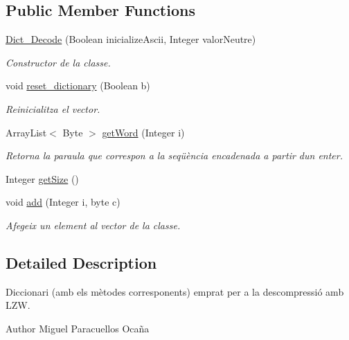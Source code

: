 \subsection*{Public Member Functions}
\begin{DoxyCompactItemize}
\item 
\hyperlink{classdomini_1_1utils_1_1Dict__Decode_a8a0f9e67c530bafc031e72c218ce74f8}{Dict\+\_\+\+Decode} (Boolean inicialize\+Ascii, Integer valor\+Neutre)
\begin{DoxyCompactList}\small\item\em Constructor de la classe. \end{DoxyCompactList}\item 
void \hyperlink{classdomini_1_1utils_1_1Dict__Decode_a635432505df1ceaa58a987bb80c6b0a3}{reset\+\_\+dictionary} (Boolean b)
\begin{DoxyCompactList}\small\item\em Reinicialitza el vector. \end{DoxyCompactList}\item 
Array\+List$<$ Byte $>$ \hyperlink{classdomini_1_1utils_1_1Dict__Decode_a0f6457460aefe9df50f0cad48f58feee}{get\+Word} (Integer i)
\begin{DoxyCompactList}\small\item\em Retorna la paraula que correspon a la seqüència encadenada a partir d\textquotesingle{}un enter. \end{DoxyCompactList}\item 
Integer \hyperlink{classdomini_1_1utils_1_1Dict__Decode_aac69020c3515649e8c2d70e2908e3f3e}{get\+Size} ()
\item 
void \hyperlink{classdomini_1_1utils_1_1Dict__Decode_a077011e4507db308d143ea9b7146abb9}{add} (Integer i, byte c)
\begin{DoxyCompactList}\small\item\em Afegeix un element al vector de la classe. \end{DoxyCompactList}\end{DoxyCompactItemize}


\subsection{Detailed Description}
Diccionari (amb els mètodes corresponents) emprat per a la descompressió amb L\+ZW. 

\begin{DoxyAuthor}{Author}
Miguel Paracuellos Ocaña 
\end{DoxyAuthor}


